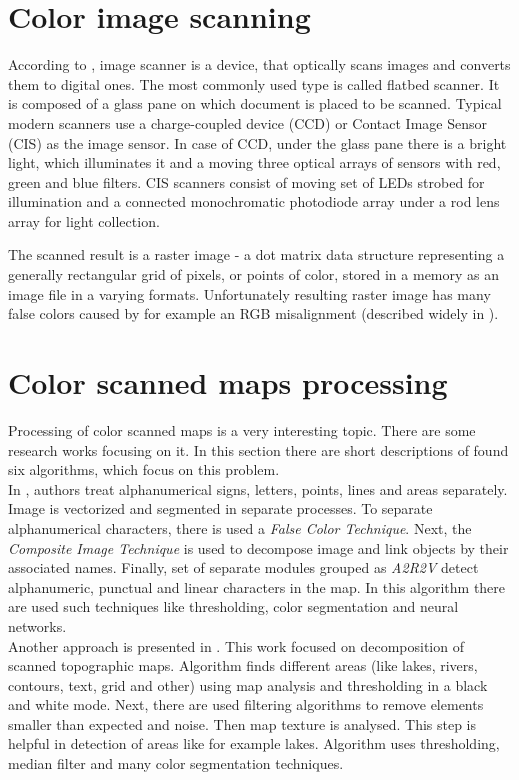 \documentclass[a4paper,onecolumn,oneside,12pt]{memoir}
\begin{document}
\section{Color image scanning}

According to \cite{imageScanner}, image scanner is a device, that optically scans images and
converts them to digital ones. The most commonly used type is called flatbed scanner. It is composed
of a glass pane on which document is placed to be scanned. Typical modern scanners use a 
charge-coupled device (CCD) or Contact Image Sensor (CIS) as the image sensor. In case of CCD, under
the glass pane there is a bright light, which illuminates it and a moving three optical arrays of
sensors with red, green and blue filters. CIS scanners consist of moving set of LEDs strobed for
illumination and a connected monochromatic photodiode array under a rod lens array for light
collection.

The scanned result is a raster image - a dot matrix data structure representing a generally
rectangular grid of pixels, or points of color, stored in a memory as an image file in a varying
formats. Unfortunately resulting raster image has many false colors caused by for example an RGB
misalignment (described widely in \cite{colorMapSegmentation}).

\section{Color scanned maps processing}

Processing of color scanned maps is a very interesting topic. There are some research works focusing
on it. In this section there are short descriptions of found six algorithms, which focus on this
problem. \\

In \cite{semanticAnalysisAndRecognition}, authors treat alphanumerical signs, letters, points, lines
and areas separately. Image is vectorized and segmented in separate processes. To separate 
alphanumerical characters, there is used a \textit{False Color Technique}. Next, the 
\textit{Composite Image Technique} is used to decompose image and link objects by their associated
names. Finally, set of separate modules grouped as \textit{A2R2V} detect alphanumeric, punctual and
linear characters in the map. In this algorithm there are used such techniques like thresholding,
color segmentation and neural networks. \\

Another approach is presented in \cite{comparativeAnalysisOfScannedMaps}. This work focused on 
decomposition of scanned topographic maps. Algorithm finds different areas (like lakes, rivers,
contours, text, grid and other) using map analysis and thresholding in a black and white mode.
Next, there are used filtering algorithms to remove elements smaller than expected and noise.
Then map texture is analysed. This step is helpful in detection of areas like for example lakes.
Algorithm uses thresholding, median filter and many color segmentation techniques. \\
\end{document}
